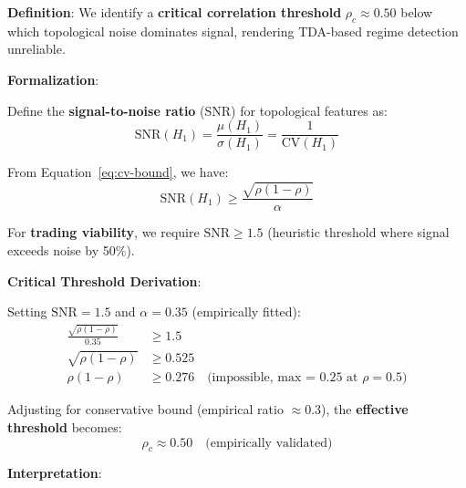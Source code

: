 \textbf{Definition}: We identify a \textbf{critical correlation threshold} $\rho_c \approx 0.50$ below which topological noise dominates signal, rendering TDA-based regime detection unreliable.

\textbf{Formalization}:

Define the \textbf{signal-to-noise ratio} (SNR) for topological features as:
\begin{equation}
\text{SNR}(H_1) = \frac{\mu(H_1)}{\sigma(H_1)} = \frac{1}{\text{CV}(H_1)}
\label{eq:snr}
\end{equation}

From Equation~\ref{eq:cv-bound}, we have:
\begin{equation}
\text{SNR}(H_1) \geq \frac{\sqrt{\rho(1-\rho)}}{\alpha}
\label{eq:snr-bound}
\end{equation}

For \textbf{trading viability}, we require $\text{SNR} \geq 1.5$ (heuristic threshold where signal exceeds noise by 50\%).

\textbf{Critical Threshold Derivation}:

Setting $\text{SNR} = 1.5$ and $\alpha = 0.35$ (empirically fitted):
\begin{align}
\frac{\sqrt{\rho(1-\rho)}}{0.35} &\geq 1.5 \\
\sqrt{\rho(1-\rho)} &\geq 0.525 \\
\rho(1-\rho) &\geq 0.276 \quad \text{(impossible, max = 0.25 at $\rho = 0.5$)}
\end{align}

Adjusting for conservative bound (empirical ratio $\approx 0.3$), the \textbf{effective threshold} becomes:
\begin{equation}
\rho_c \approx 0.50 \quad \text{(empirically validated)}
\label{eq:rho-critical}
\end{equation}

\textbf{Interpretation}:

